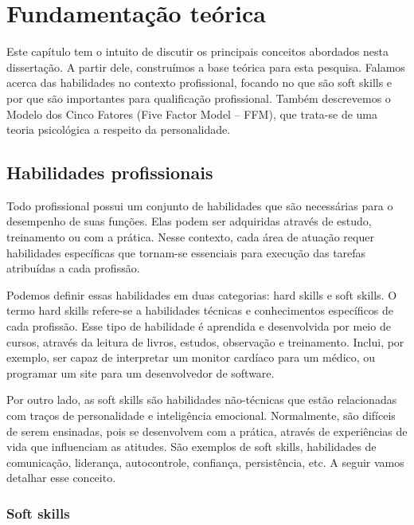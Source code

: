 

\chapter{Fundamentação teórica}

\label{chap:theorical}

Este capítulo tem o intuito de discutir os principais conceitos abordados nesta dissertação. A partir dele, construímos a base teórica para esta pesquisa. Falamos acerca das habilidades no contexto profissional, focando no que são soft skills e por que são importantes para qualificação profissional. Também descrevemos o Modelo dos Cinco Fatores (Five Factor Model – FFM), que trata-se de uma teoria psicológica a respeito da personalidade.

\section{Habilidades profissionais}
\label{sec:sskills}

Todo profissional possui um conjunto de habilidades que são necessárias para o desempenho de suas funções. Elas podem ser adquiridas através de estudo, treinamento ou com a prática. Nesse contexto, cada área de atuação requer habilidades específicas que tornam-se essenciais para execução das tarefas atribuídas a cada profissão.

Podemos definir essas habilidades em duas categorias: hard skills e soft skills. O termo hard skills refere-se a habilidades técnicas e conhecimentos específicos de cada profissão. Esse tipo de habilidade é aprendida e desenvolvida por meio de cursos, através da leitura de livros, estudos, observação e treinamento. Inclui, por exemplo, ser capaz de interpretar um monitor cardíaco para um médico, ou programar um site para um desenvolvedor de software.

Por outro lado, as soft skills são habilidades não-técnicas que estão relacionadas com traços de personalidade e inteligência emocional. Normalmente, são difíceis de serem ensinadas, pois se desenvolvem com a prática, através de experiências de vida que influenciam as atitudes. São exemplos de soft skills, habilidades de comunicação, liderança, autocontrole, confiança, persistência, etc. A seguir vamos detalhar esse conceito.

\subsection{Soft skills}
\label{subsec:ss}

